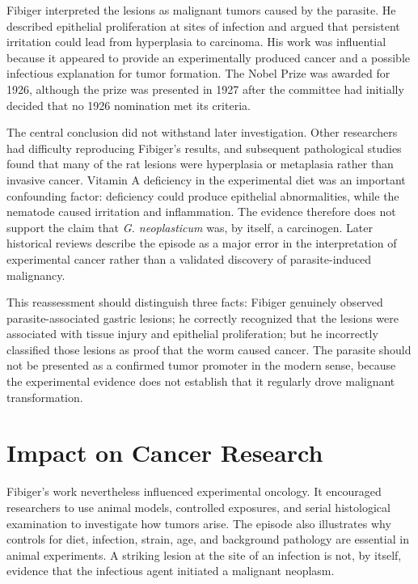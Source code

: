 Fibiger interpreted the lesions as malignant tumors caused by the parasite. He described epithelial proliferation at sites of infection and argued that persistent irritation could lead from hyperplasia to carcinoma. His work was influential because it appeared to provide an experimentally produced cancer and a possible infectious explanation for tumor formation. The Nobel Prize was awarded for 1926, although the prize was presented in 1927 after the committee had initially decided that no 1926 nomination met its criteria\cite{nobel-1926}.

The central conclusion did not withstand later investigation. Other researchers had difficulty reproducing Fibiger's results, and subsequent pathological studies found that many of the rat lesions were hyperplasia or metaplasia rather than invasive cancer. Vitamin A deficiency in the experimental diet was an important confounding factor: deficiency could produce epithelial abnormalities, while the nematode caused irritation and inflammation. The evidence therefore does not support the claim that \emph{G. neoplasticum} was, by itself, a carcinogen. Later historical reviews describe the episode as a major error in the interpretation of experimental cancer rather than a validated discovery of parasite-induced malignancy\cite{cancer-history}.

This reassessment should distinguish three facts: Fibiger genuinely observed parasite-associated gastric lesions; he correctly recognized that the lesions were associated with tissue injury and epithelial proliferation; but he incorrectly classified those lesions as proof that the worm caused cancer. The parasite should not be presented as a confirmed tumor promoter in the modern sense, because the experimental evidence does not establish that it regularly drove malignant transformation.

\section{Impact on Cancer Research}

Fibiger's work nevertheless influenced experimental oncology. It encouraged researchers to use animal models, controlled exposures, and serial histological examination to investigate how tumors arise. The episode also illustrates why controls for diet, infection, strain, age, and background pathology are essential in animal experiments. A striking lesion at the site of an infection is not, by itself, evidence that the infectious agent initiated a malignant neoplasm.

